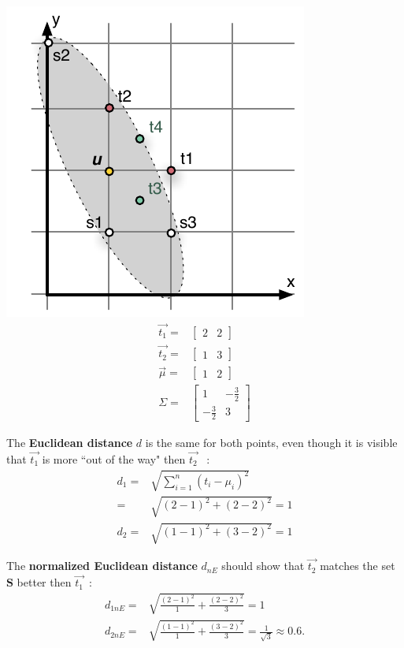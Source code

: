 \documentclass[11pt,twocolumn]{amsart} %
\begin{document}
\includegraphics{points.pdf}
\begin{align*}
  \vec{t_1}  = & \begin{bmatrix} 2 & 2 \end{bmatrix} \\
  \vec{t_2}  = & \begin{bmatrix} 1 & 3 \end{bmatrix} \\
  \vec{\mu} = & \begin{bmatrix} 1 & 2 \end{bmatrix} \\
  \Sigma    = & \begin{bmatrix} 1 & -\frac{3}{2} \\ -\frac{3}{2} & 3\end{bmatrix}
\end{align*}

The \textbf{Euclidean distance} $d$ is the same for both points, even though it is visible that $\vec{t_1}$ is more ``out of the way" then $\vec{t_2}$ ~:
\begin{align*}
  d_1 = & \sqrt{\sum_{i=1}^{n}(t_i - \mu_i)^2} \\
     = & \sqrt{(2-1)^2 + (2-2)^2} = 1 \\
  d_2 = & \sqrt{(1-1)^2 + (3-2)^2} = 1
\end{align*}

The \textbf{normalized Euclidean distance} $d_{nE}$ should show that $\vec{t_2}$ matches the set $\textbf{S}$ better then $\vec{t_1}$~:
\begin{align*}
  d_{1nE} = & \sqrt{\frac{(2-1)^2}{1} + \frac{(2-2)^2}{3}} = 1 \\
  d_{2nE} = & \sqrt{\frac{(1-1)^2}{1} + \frac{(3-2)^2}{3}} = \frac{1}{\sqrt{3}} \approx 0.6.
\end{align*}
\end{document}
